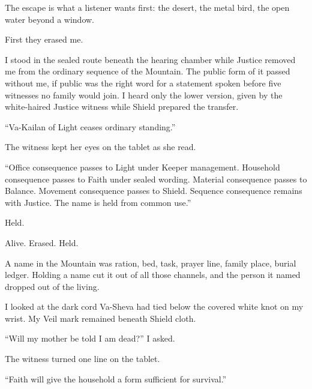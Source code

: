 

\ornament

The escape is what a listener wants first: the desert, the metal bird, the open water beyond a window.\par

First they erased me.\par

\ornament

I stood in the sealed route beneath the hearing chamber while Justice removed me from the ordinary sequence of the Mountain. The public form of it passed without me, if public was the right word for a statement spoken before five witnesses no family would join. I heard only the lower version, given by the white-haired Justice witness while Shield prepared the transfer.\par

``Va-Kailan of Light ceases ordinary standing.''\par

The witness kept her eyes on the tablet as she read.\par

``Office consequence passes to Light under Keeper management. Household consequence passes to Faith under sealed wording. Material consequence passes to Balance. Movement consequence passes to Shield. Sequence consequence remains with Justice. The name is held from common use.''\par

Held.\par

Alive. Erased. Held.\par

A name in the Mountain was ration, bed, task, prayer line, family place, burial ledger. Holding a name cut it out of all those channels, and the person it named dropped out of the living.\par

I looked at the dark cord Va-Sheva had tied below the covered white knot on my wrist. My Veil mark remained beneath Shield cloth.\par

``Will my mother be told I am dead?'' I asked.\par

The witness turned one line on the tablet.\par

``Faith will give the household a form sufficient for survival.''\par

